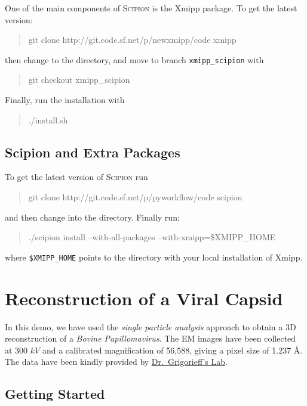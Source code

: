 \documentclass[12pt]{article} %
\newcommand{\scipion}{\textsc{Scipion} }
\newenvironment{command}{\tt\begin{quote}}{\end{quote}}
\begin{document}
One of the main components of \scipion is the Xmipp package. To get
the latest version:

\begin{command}
git clone http://git.code.sf.net/p/newxmipp/code xmipp
\end{command}

\noindent
then change to the  directory, and move to branch
\verb+xmipp_scipion+ with

\begin{command}
git checkout xmipp\_scipion
\end{command}

Finally, run the installation with

\begin{command}
./install.sh
\end{command}

\subsection{Scipion and Extra Packages}

To get the latest version of \scipion run

\begin{command}
git clone http://git.code.sf.net/p/pyworkflow/code scipion
\end{command}

\noindent
and then change into the  directory. Finally run:

\begin{command}
./scipion install --with-all-packages --with-xmipp=\$XMIPP\_HOME
\end{command}

\noindent
where \verb+$XMIPP_HOME+ points to the directory with your local
installation of Xmipp.


\section{Reconstruction of a Viral Capsid}

In this demo, we have used the \emph{single particle analysis} approach to obtain
a 3D reconstruction of a \emph{Bovine Papillomavirus}. The EM images have been
collected at 300 $kV$ and a calibrated magnification of 56,588,
giving a pixel
size of 1.237 \AA  \citep{Wolf2010}. The data have been kindly
provided by \href{http://grigoriefflab.janelia.org/}{Dr.~Grigorieff’s Lab}.

\subsection{Getting Started}
\end{document}
